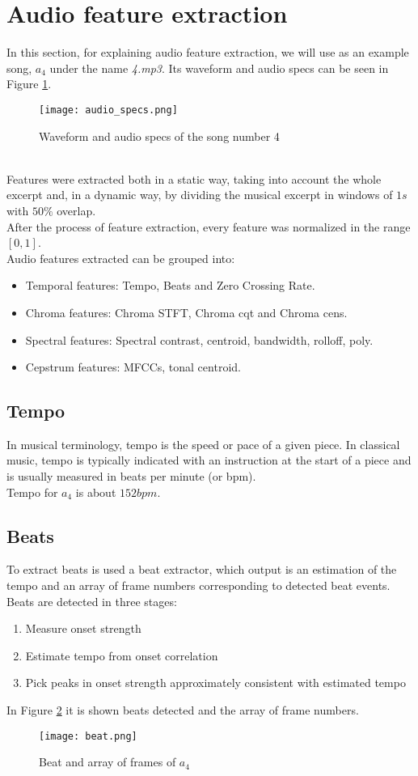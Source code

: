 \newpage
\section{Audio feature extraction}
In this section, for explaining audio feature extraction, we will use as an example song, $a_4$ under the name \textit{4.mp3}. Its waveform and audio specs can be seen in Figure \ref{fig:audio_specs}.
\begin{figure}[h]
    \centering
    \texttt{[image: audio\_specs.png]} 
	\caption{Waveform and audio specs of the song number 4}
    \label{fig:audio_specs}
\end{figure}
\\
Features were extracted both in a static way, taking into account the whole excerpt and, in a dynamic way, by dividing the musical excerpt in windows of $1s$ with $50\%$ overlap.
\\
After the process of feature extraction, every feature was normalized in the range $[0,1]$.
\\
Audio features extracted can be grouped into:
\begin{itemize}
	\item Temporal features: Tempo, Beats and Zero Crossing Rate.
	\item Chroma features: Chroma STFT, Chroma cqt and Chroma cens.
	\item Spectral features: Spectral contrast, centroid, bandwidth, rolloff, poly.
	\item Cepstrum features: MFCCs, tonal centroid.
\end{itemize}

\subsection{Tempo}
In musical terminology, tempo  is the speed or pace of a given piece. In classical music, tempo is typically indicated with an instruction at the start of a piece and is usually measured in beats per minute (or bpm).
\\
Tempo for $a_4$ is about $152 bpm$.

\subsection{Beats}
To extract beats is used a beat extractor, which output is an estimation of the tempo and an array of frame numbers corresponding to detected beat events.
\\
Beats are detected in three stages:
\begin{enumerate}	
	\item Measure onset strength
	\item Estimate tempo from onset correlation
	\item Pick peaks in onset strength approximately consistent with estimated tempo
\end{enumerate}
In Figure \ref{fig:beat} it is shown beats detected and the array of frame numbers.
\begin{figure}[h]
    \centering
    \texttt{[image: beat.png]} 
	\caption{Beat and array of frames of $a_4$}
    \label{fig:beat}
\end{figure}

